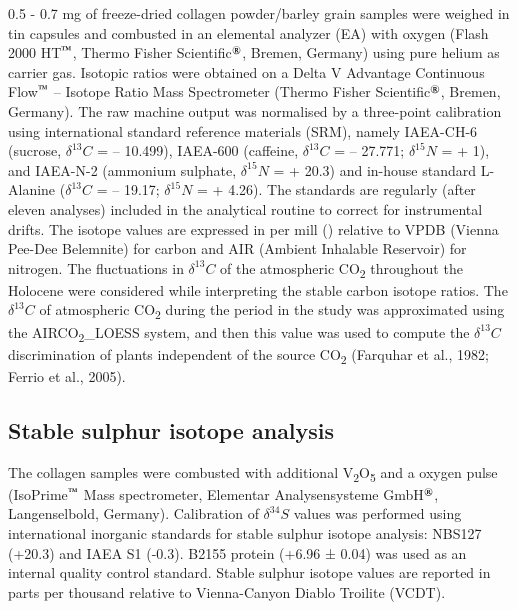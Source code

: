 \documentclass[3p]{elsarticle} %
\begin{document}
0.5 - 0.7 mg of freeze-dried collagen powder/barley grain samples were weighed in tin capsules and combusted in an elemental analyzer (EA) with oxygen (Flash 2000 HT\(^\text{\texttrademark}\), Thermo Fisher Scientific\(^\text{\textregistered}\), Bremen, Germany) using pure helium as carrier gas. Isotopic ratios were obtained on a Delta V Advantage Continuous Flow\(^\text{\texttrademark}\) -- Isotope Ratio Mass Spectrometer (Thermo Fisher Scientific\(^\text{\textregistered}\), Bremen, Germany). The raw machine output was normalised by a three-point calibration using international standard reference materials (SRM), namely IAEA-CH-6 (sucrose, \(\delta ^{13}C\) = -- 10.499\permil), IAEA-600 (caffeine, \(\delta ^{13}C\) = -- 27.771\permil; \(\delta ^{15}N\) = + 1\permil), and IAEA-N-2 (ammonium sulphate, \(\delta ^{15}N\) = + 20.3\permil) and in-house standard L-Alanine (\(\delta ^{13}C\) = -- 19.17\permil; \(\delta ^{15}N\) = + 4.26\permil). The standards are regularly (after eleven analyses) included in the analytical routine to correct for instrumental drifts. The isotope values are expressed in per mill (\permil) relative to VPDB (Vienna Pee-Dee Belemnite) for carbon and AIR (Ambient Inhalable Reservoir) for nitrogen. The fluctuations in \(\delta ^{13}C\) of the atmospheric CO\textsubscript{2} throughout the Holocene were considered while interpreting the stable carbon isotope ratios. The \(\delta ^{13}C\) of atmospheric CO\textsubscript{2} during the period in the study was approximated using the AIRCO\textsubscript{2}\_LOESS system, and then this value was used to compute the \(\delta ^{13}C\) discrimination of plants independent of the source CO\textsubscript{2} (Farquhar et al., 1982; Ferrio et al., 2005).

\hypertarget{stable-sulphur-isotope-analysis}{%
\subsection{Stable sulphur isotope analysis}\label{stable-sulphur-isotope-analysis}}

The collagen samples were combusted with additional V\textsubscript{2}O\textsubscript{5} and a oxygen pulse (IsoPrime\(^\text{\texttrademark}\) Mass spectrometer, Elementar Analysensysteme GmbH\(^\text{\textregistered}\), Langenselbold, Germany). Calibration of \(\delta ^{34}S\) values was performed using international inorganic standards for stable sulphur isotope analysis: NBS127 (+20.3\permil) and IAEA S1 (-0.3\permil). B2155 protein (+6.96 ± 0.04\permil) was used as an internal quality control standard. Stable sulphur isotope values are reported in parts per thousand relative to Vienna-Canyon Diablo Troilite (VCDT).
\end{document}
